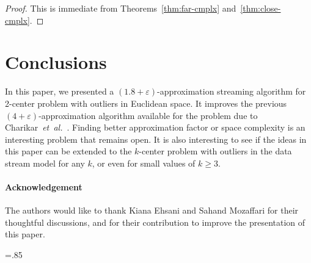 \documentclass[envcountsame]{cls/cccg15}
\renewcommand{\O}{\ensuremath{{O}}}
\newcommand{\gee}{\geqslant}
\renewcommand{\ge}{\gee}
\newcommand{\eps}{\varepsilon}
\newcommand{\etal}{{\em et~al.\/}}
\begin{document}
\begin{proof}
This is immediate from Theorems~\ref{thm:far-cmplx} and~\ref{thm:close-cmplx}.
\end{proof}


%


\section{Conclusions}
\label{sec:conc}

In this paper, we presented a $(1.8 + \eps)$-approximation streaming algorithm for 2-center problem with outliers in Euclidean space.
It improves the previous $(4+\eps)$-approximation algorithm available for the problem 
due to Charikar~\etal~\cite{mccutchen2008streaming}. 
Finding better approximation factor or space complexity
is an interesting problem that remains open.
It is also interesting to see if the ideas in this paper 
can be extended to the $k$-center problem with outliers in the data stream model
for any $k$, or even for small values of $k \ge 3$.


\paragraph{Acknowledgement}
The authors would like to thank Kiana Ehsani and Sahand Mozaffari 
for their thoughtful discussions, 
and for their contribution to improve the presentation of this paper.



\small
\baselineskip=.85\baselineskip


\end{document}
